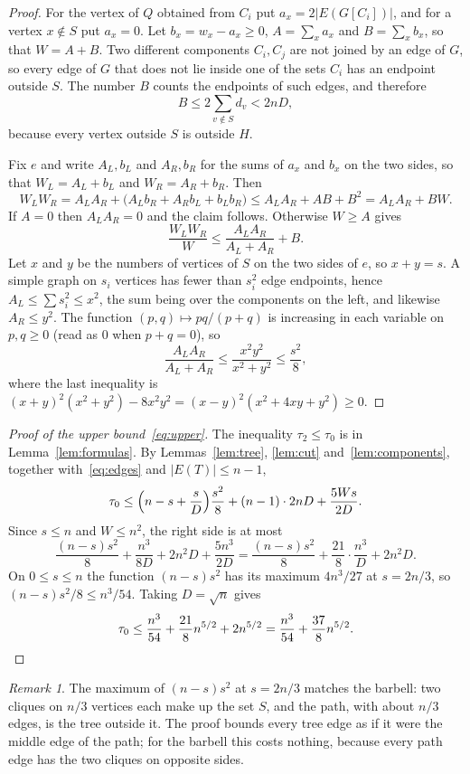 \documentclass[11pt]{amsart}
\theoremstyle{definition}
\theoremstyle{remark}
\newtheorem{remark}[theorem]{Remark}
\numberwithin{equation}{section}
\begin{document}
\begin{proof}
For the vertex of $Q$ obtained from $C_i$ put $a_x=2|E(G[C_i])|$, and for a vertex $x\notin S$ put $a_x=0$. Let $b_x=w_x-a_x\ge0$, $A=\sum_xa_x$ and $B=\sum_xb_x$, so that $W=A+B$. Two different components $C_i,C_j$ are not joined by an edge of $G$, so every edge of $G$ that does not lie inside one of the sets $C_i$ has an endpoint outside $S$. The number $B$ counts the endpoints of such edges, and therefore
\[
B\le2\sum_{v\notin S}d_v<2nD,
\]
because every vertex outside $S$ is outside $H$.

Fix $e$ and write $A_L,b_L$ and $A_R,b_R$ for the sums of $a_x$ and $b_x$ on the two sides, so that $W_L=A_L+b_L$ and $W_R=A_R+b_R$. Then
\[
W_LW_R=A_LA_R+\bigl(A_Lb_R+A_Rb_L+b_Lb_R\bigr)\le A_LA_R+AB+B^2=A_LA_R+BW .
\]
If $A=0$ then $A_LA_R=0$ and the claim follows. Otherwise $W\ge A$ gives
\[
\frac{W_LW_R}W\le\frac{A_LA_R}{A_L+A_R}+B .
\]
Let $x$ and $y$ be the numbers of vertices of $S$ on the two sides of $e$, so $x+y=s$. A simple graph on $s_i$ vertices has fewer than $s_i^2$ edge endpoints, hence $A_L\le\sum s_i^2\le x^2$, the sum being over the components on the left, and likewise $A_R\le y^2$. The function $(p,q)\mapsto pq/(p+q)$ is increasing in each variable on $p,q\ge0$ (read as $0$ when $p+q=0$), so
\[
\frac{A_LA_R}{A_L+A_R}\le\frac{x^2y^2}{x^2+y^2}\le\frac{s^2}8 ,
\]
where the last inequality is $(x+y)^2(x^2+y^2)-8x^2y^2=(x-y)^2(x^2+4xy+y^2)\ge0$.
\end{proof}

\begin{proof}[Proof of the upper bound~\eqref{eq:upper}]
The inequality $\tau_2\le\tau_0$ is in Lemma~\ref{lem:formulas}. By Lemmas~\ref{lem:tree}, \ref{lem:cut} and~\ref{lem:components}, together with~\eqref{eq:edges} and $|E(T)|\le n-1$,
\[
\tau_0\le\Bigl(n-s+\frac sD\Bigr)\frac{s^2}8+(n-1)\cdot2nD+\frac{5Ws}{2D}.
\]
Since $s\le n$ and $W\le n^2$, the right side is at most
\[
\frac{(n-s)s^2}8+\frac{n^3}{8D}+2n^2D+\frac{5n^3}{2D}=\frac{(n-s)s^2}8+\frac{21}8\cdot\frac{n^3}D+2n^2D .
\]
On $0\le s\le n$ the function $(n-s)s^2$ has its maximum $4n^3/27$ at $s=2n/3$, so $(n-s)s^2/8\le n^3/54$. Taking $D=\sqrt n$ gives
\[
\tau_0\le\frac{n^3}{54}+\frac{21}8n^{5/2}+2n^{5/2}=\frac{n^3}{54}+\frac{37}8n^{5/2}.\qedhere
\]
\end{proof}

\begin{remark}
The maximum of $(n-s)s^2$ at $s=2n/3$ matches the barbell: two cliques on $n/3$ vertices each make up the set $S$, and the path, with about $n/3$ edges, is the tree outside it. The proof bounds every tree edge as if it were the middle edge of the path; for the barbell this costs nothing, because every path edge has the two cliques on opposite sides.
\end{remark}
\end{document}
